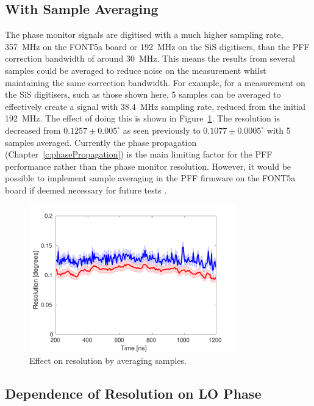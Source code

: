\subsection{With Sample Averaging}
\label{ss:resCalAlongPulse}

The phase monitor signals are digitised with a much higher sampling rate, 357~MHz on the FONT5a board or 192~MHz on the SiS digitisers, than the PFF correction bandwidth of around 30~MHz. This means the results from several samples could be averaged to reduce noise on the measurement whilst maintaining the same correction bandwidth. For example, for a measurement on the SiS digitisers, such as those shown here, 5 samples can be averaged to effectively create a signal with 38.4~MHz sampling rate, reduced from the initial 192~MHz. The effect of doing this is shown in Figure~\ref{f:resolutionWithAveraging}. The resolution is decreased from \(0.1257\pm0.005^\circ\) as seen previously to \(0.1077\pm0.0005^\circ\) with 5 samples averaged. Currently the phase propagation (Chapter~\ref{c:phasePropagation}) is the main limiting factor for the PFF performance rather than the phase monitor resolution. However, it would be possible to implement sample averaging in the PFF firmware on the FONT5a board if deemed necessary for future tests \cite{glennPriv}.

\begin{figure}
  \centering
  \includegraphics[width=0.8\textwidth]{Figures/phaseMons/resolutionWithAveraging}
  \caption{Effect on resolution by averaging samples.}
  \label{f:resolutionWithAveraging}
\end{figure}


\subsection{Dependence of Resolution on LO Phase}
\label{ss:resVsShifter}


